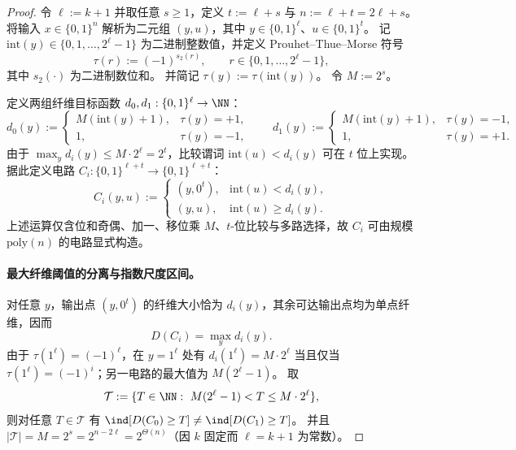 \begin{proof}
令 \(\ell:=k+1\) 并取任意 \(s\ge 1\)，定义 \(t:=\ell+s\) 与 \(n:=\ell+t=2\ell+s\)。
将输入 \(x\in\{0,1\}^{n}\) 解析为二元组 \((y,u)\)，其中 \(y\in\{0,1\}^{\ell}\)、\(u\in\{0,1\}^{t}\)。
记 \(\mathrm{int}(y)\in\{0,1,\dots,2^{\ell}-1\}\) 为二进制整数值，并定义 Prouhet--Thue--Morse 符号
\[
\tau(r):=(-1)^{s_2(r)},\qquad r\in\{0,1,\dots,2^{\ell}-1\},
\]
其中 \(s_2(\cdot)\) 为二进制数位和。
并简记 \(\tau(y):=\tau(\mathrm{int}(y))\)。
令 \(M:=2^s\)。

定义两组纤维目标函数 \(d_0,d_1:\{0,1\}^{\ell}\to\NN\)：
\[
d_0(y):=
\begin{cases}
M(\mathrm{int}(y)+1),& \tau(y)=+1,\\
1,& \tau(y)=-1,
\end{cases}
\qquad
d_1(y):=
\begin{cases}
M(\mathrm{int}(y)+1),& \tau(y)=-1,\\
1,& \tau(y)=+1.
\end{cases}
\]
由于 \(\max_y d_i(y)\le M\cdot 2^{\ell}=2^t\)，比较谓词 \(\mathrm{int}(u)<d_i(y)\) 可在 \(t\) 位上实现。
据此定义电路 \(C_i:\{0,1\}^{\ell+t}\to\{0,1\}^{\ell+t}\)：
\[
C_i(y,u):=
\begin{cases}
(y,0^t),& \mathrm{int}(u)<d_i(y),\\
(y,u),& \mathrm{int}(u)\ge d_i(y).
\end{cases}
\]
上述运算仅含位和奇偶、加一、移位乘 \(M\)、\(t\)-位比较与多路选择，故 \(C_i\) 可由规模 \(\mathrm{poly}(n)\) 的电路显式构造。

\paragraph{最大纤维阈值的分离与指数尺度区间。}
对任意 \(y\)，输出点 \((y,0^t)\) 的纤维大小恰为 \(d_i(y)\)，其余可达输出点均为单点纤维，因而
\[
D(C_i)=\max_{y} d_i(y).
\]
由于 \(\tau(1^{\ell})=(-1)^{\ell}\)，在 \(y=1^{\ell}\) 处有
\(
d_i(1^{\ell})=M\cdot 2^{\ell}
\)
当且仅当 \(\tau(1^{\ell})=(-1)^i\)；另一电路的最大值为 \(M(2^{\ell}-1)\)。
取
\[
\mathcal T:=\{T\in\NN:\ M(2^{\ell}-1)<T\le M\cdot 2^{\ell}\},
\]
则对任意 \(T\in\mathcal T\) 有 \(\ind[D(C_0)\ge T]\ne \ind[D(C_1)\ge T]\)。
并且 \(|\mathcal T|=M=2^s=2^{n-2\ell}=2^{\Theta(n)}\)（因 \(k\) 固定而 \(\ell=k+1\) 为常数）。


\end{proof}
